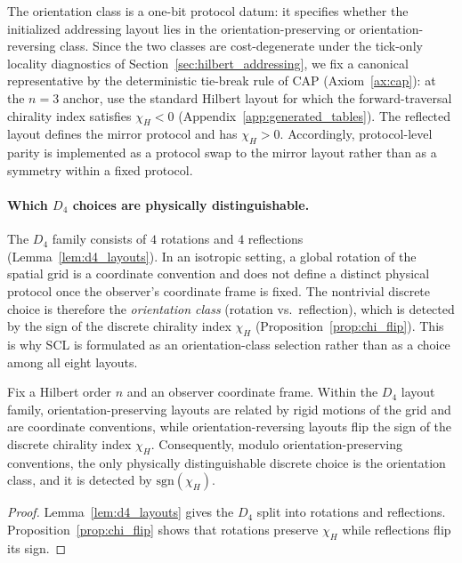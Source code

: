 \begin{definition}
\label{def:scl}
The orientation class is a one-bit protocol datum: it specifies whether the initialized addressing layout lies in the orientation-preserving or orientation-reversing class.
Since the two classes are cost-degenerate under the tick-only locality diagnostics of Section~\ref{sec:hilbert_addressing}, we fix a canonical representative by the deterministic tie-break rule of CAP (Axiom~\ref{ax:cap}): at the $n=3$ anchor, use the standard Hilbert layout for which the forward-traversal chirality index satisfies $\chi_H<0$ (Appendix~\ref{app:generated_tables}).
The reflected layout defines the mirror protocol and has $\chi_H>0$.
Accordingly, protocol-level parity is implemented as a protocol swap to the mirror layout rather than as a symmetry within a fixed protocol.
\end{definition}

\paragraph{Which \texorpdfstring{$D_4$}{D4} choices are physically distinguishable.}
The $D_4$ family consists of $4$ rotations and $4$ reflections (Lemma~\ref{lem:d4_layouts}).
In an isotropic setting, a global rotation of the spatial grid is a coordinate convention and does not define a distinct physical protocol once the observer's coordinate frame is fixed.
The nontrivial discrete choice is therefore the \emph{orientation class} (rotation vs.\ reflection), which is detected by the sign of the discrete chirality index $\chi_H$ (Proposition~\ref{prop:chi_flip}).
This is why SCL is formulated as an orientation-class selection rather than as a choice among all eight layouts.

\begin{proposition}\label{prop:orientation_class_minimal}
Fix a Hilbert order $n$ and an observer coordinate frame.
Within the $D_4$ layout family, orientation-preserving layouts are related by rigid motions of the grid and are coordinate conventions, while orientation-reversing layouts flip the sign of the discrete chirality index $\chi_H$.
Consequently, modulo orientation-preserving conventions, the only physically distinguishable discrete choice is the orientation class, and it is detected by $\mathrm{sgn}(\chi_H)$.
\end{proposition}
\begin{proof}
Lemma~\ref{lem:d4_layouts} gives the $D_4$ split into rotations and reflections.
Proposition~\ref{prop:chi_flip} shows that rotations preserve $\chi_H$ while reflections flip its sign.
\end{proof}

